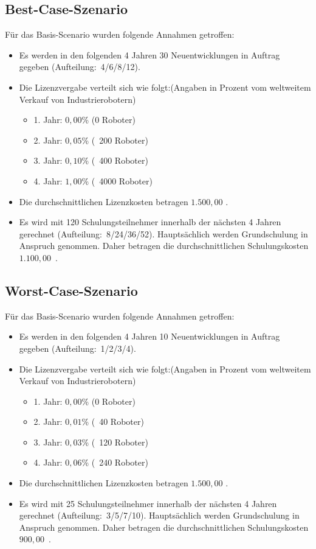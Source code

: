 \subsection{Best-Case-Szenario}
Für das Basis-Scenario wurden folgende Annahmen getroffen:
\begin{itemize}
	\item Es werden in den folgenden 4 Jahren 30 Neuentwicklungen in Auftrag gegeben (Aufteilung:~4/6/8/12).
	\item Die Lizenzvergabe verteilt sich wie folgt:\newline (Angaben in Prozent vom weltweitem Verkauf von Industrierobotern)
	\begin{itemize}
		\item 1. Jahr: $0,00$\% (0 Roboter)
		\item 2. Jahr: $0,05$\% (~200 Roboter)
		\item 3. Jahr: $0,10$\% (~400 Roboter)
		\item 4. Jahr: $1,00$\% (~4000 Roboter)
	\end{itemize}
	\item Die durchschnittlichen Lizenzkosten betragen $1.500,00$ \officialeuro.
	\item Es wird mit 120 Schulungsteilnehmer innerhalb der nächsten 4 Jahren gerechnet (Aufteilung:~8/24/36/52). Hauptsächlich werden Grundschulung in Anspruch genommen. Daher betragen die durchschnittlichen Schulungskosten $1.100,00$~\officialeuro.
\end{itemize}

\subsection{Worst-Case-Szenario}
Für das Basis-Scenario wurden folgende Annahmen getroffen:
\begin{itemize}
	\item Es werden in den folgenden 4 Jahren 10 Neuentwicklungen in Auftrag gegeben (Aufteilung:~1/2/3/4).
	\item Die Lizenzvergabe verteilt sich wie folgt:\newline (Angaben in Prozent vom weltweitem Verkauf von Industrierobotern)
	\begin{itemize}
		\item 1. Jahr: $0,00$\% (0 Roboter)
		\item 2. Jahr: $0,01$\% (~40 Roboter)
		\item 3. Jahr: $0,03$\% (~120 Roboter)
		\item 4. Jahr: $0,06$\% (~240 Roboter)
	\end{itemize}
	\item Die durchschnittlichen Lizenzkosten betragen $1.500,00$ \officialeuro.
	\item Es wird mit 25 Schulungsteilnehmer innerhalb der nächsten 4 Jahren gerechnet (Aufteilung:~3/5/7/10). Hauptsächlich werden Grundschulung in Anspruch genommen. Daher betragen die durchschnittlichen Schulungskosten $900,00$~\officialeuro.
\end{itemize}